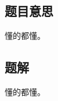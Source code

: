 \subsection{题目意思}
\begin{frame} %
懂的都懂。
\end{frame}



\subsection{题解}
\begin{frame}
懂的都懂。
\end{frame}

